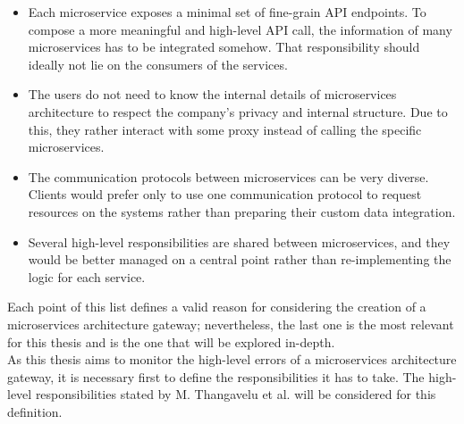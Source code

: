 \documentclass[english, 12pt, a4paper, sci, utf8, a-1b, online]{aaltothesis}
\begin{document}
\begin{itemize}
    \item Each microservice exposes a minimal set of fine-grain API endpoints. To compose a more meaningful and high-level API call, the information of many microservices has to be integrated somehow. That responsibility should ideally not lie on the consumers of the services.
    \item The users do not need to know the internal details of microservices architecture to respect the company's privacy and internal structure. Due to this, they rather interact with some proxy instead of calling the specific microservices.
    \item The communication protocols between microservices can be very diverse. Clients would prefer only to use one communication protocol to request resources on the systems rather than preparing their custom data integration.
    \item Several high-level responsibilities are shared between microservices, and they would be better managed on a central point rather than re-implementing the logic for each service.
\end{itemize}

Each point of this list defines a valid reason for considering the creation of a microservices architecture gateway; nevertheless, the last one is the most relevant for this thesis and is the one that will be explored in-depth.\\

As this thesis aims to monitor the high-level errors of a microservices architecture gateway, it is necessary first to define the responsibilities it has to take. The high-level responsibilities stated by M. Thangavelu et al. \cite{UberGateway} will be considered for this definition.
\end{document}
